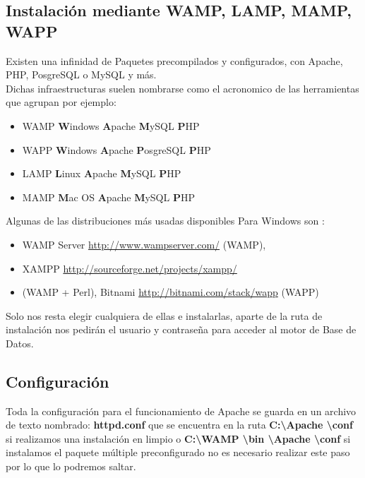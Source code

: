 \subsection{Instalación mediante WAMP, LAMP, MAMP, WAPP}

Existen una infinidad de Paquetes precompilados y configurados, con Apache, PHP, PosgreSQL o MySQL y más. \\[0.5cm]
Dichas infraestructuras suelen nombrarse como el acronomico de las herramientas que agrupan por ejemplo:\\[0.5cm]

\begin{itemize}
    \item {\large WAMP {\bfseries W}indows {\bfseries A}pache {\bfseries M}ySQL {\bfseries P}HP}
    \item {\large WAPP  {\bfseries W}indows {\bfseries A}pache {\bfseries P}osgreSQL {\bfseries P}HP}  
    \item {\large LAMP {\bfseries L}inux {\bfseries A}pache {\bfseries M}ySQL {\bfseries P}HP} 
    \item {\large MAMP {\bfseries M}ac OS {\bfseries A}pache {\bfseries M}ySQL {\bfseries P}HP}  
\end{itemize}


Algunas de las distribuciones más usadas disponibles Para Windows son :\\[0.5cm]
\begin{itemize}
    \item WAMP Server \url{http://www.wampserver.com/} (WAMP),
    \item XAMPP \url{http://sourceforge.net/projects/xampp/} 
    \item (WAMP + Perl), Bitnami \url{http://bitnami.com/stack/wapp} (WAPP)
\end{itemize}

Solo nos resta elegir cualquiera de ellas e instalarlas, aparte de la ruta de instalación nos pedirán el usuario y
contraseña para acceder al motor de Base de Datos.

\subsection{Configuración}

Toda la configuración para el funcionamiento de Apache se guarda en un archivo de texto nombrado: {\bfseries httpd.conf} que se encuentra en la ruta {\bfseries C:\textbackslash Apache \textbackslash conf } si realizamos una instalación en limpio o {\bfseries C:\textbackslash WAMP \textbackslash bin \textbackslash  Apache \textbackslash conf } si instalamos el paquete múltiple preconfigurado no es necesario realizar este paso por lo que lo podremos saltar. \\[0.5cm]


